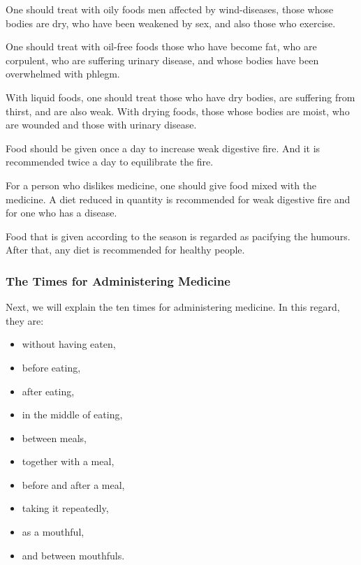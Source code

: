 \begin{translation}
\item[79] %
One should treat with oily foods %
men affected by wind-diseases, %
those whose bodies are dry,
who have been weakened by sex, %
and also those who exercise.

\item[80] %
One should treat with oil-free foods %
those who have become fat, %
who are corpulent, %
who are suffering urinary disease,
and whose bodies have been overwhelmed with phlegm. %

\item[81] %
With liquid foods, one should treat those who have dry bodies, are suffering from thirst, and are also weak. %
With drying foods, those whose bodies are moist, who are wounded and those with urinary disease.

\item[82]
Food should be given once a day to increase weak digestive fire. %
And %
it is recommended %
twice a day %
to equilibrate the fire. %

\item[83] %
For a person who dislikes medicine, one should give food mixed with the medicine. %
A diet reduced in quantity is recommended for weak digestive fire and for one who has a disease. 

\item[84] %
Food that is given according to the season is regarded as pacifying the humours. %
After that, any diet is recommended for healthy people. 

\subsubsection{The Times for Administering Medicine}

\item[85] %
Next, we will explain the ten times for administering medicine. In this regard, they are:
\begin{itemize}
\item without having eaten, 
\item before eating, 
\item after eating, 
\item in the middle of eating, 
\item between meals, 
\item together with a meal, 
\item before and after a meal, %
\item taking it repeatedly, %
\item as a mouthful, %
\item and between mouthfuls. %
\end{itemize}


\end{translation}
